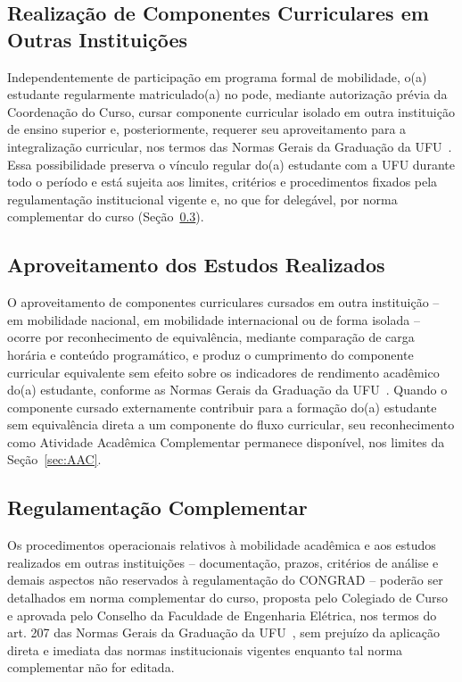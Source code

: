 \subsection{Realização de Componentes Curriculares em Outras Instituições}

Independentemente de participação em programa formal de mobilidade, o(a) estudante regularmente matriculado(a) no \ppccurso pode, mediante autorização prévia da Coordenação do Curso, cursar componente curricular isolado em outra instituição de ensino superior e, posteriormente, requerer seu aproveitamento para a integralização curricular, nos termos das Normas Gerais da Graduação da UFU~\cite{ufu_congrad_46_2022}. Essa possibilidade preserva o vínculo regular do(a) estudante com a UFU durante todo o período e está sujeita aos limites, critérios e procedimentos fixados pela regulamentação institucional vigente e, no que for delegável, por norma complementar do curso (Seção~\ref{sec:norma_complementar_mobilidade}).

\subsection{Aproveitamento dos Estudos Realizados}
\label{sec:mobilidade_aproveitamento}

O aproveitamento de componentes curriculares cursados em outra instituição -- em mobilidade nacional, em mobilidade internacional ou de forma isolada -- ocorre por reconhecimento de equivalência, mediante comparação de carga horária e conteúdo programático, e produz o cumprimento do componente curricular equivalente sem efeito sobre os indicadores de rendimento acadêmico do(a) estudante, conforme as Normas Gerais da Graduação da UFU~\cite{ufu_congrad_46_2022}. Quando o componente cursado externamente contribuir para a formação do(a) estudante sem equivalência direta a um componente do fluxo curricular, seu reconhecimento como Atividade Acadêmica Complementar permanece disponível, nos limites da Seção~\ref{sec:AAC}.

\subsection{Regulamentação Complementar}
\label{sec:norma_complementar_mobilidade}

Os procedimentos operacionais relativos à mobilidade acadêmica e aos estudos realizados em outras instituições -- documentação, prazos, critérios de análise e demais aspectos não reservados à regulamentação do CONGRAD -- poderão ser detalhados em norma complementar do curso, proposta pelo Colegiado de Curso e aprovada pelo Conselho da Faculdade de Engenharia Elétrica, nos termos do art. 207 das Normas Gerais da Graduação da UFU~\cite{ufu_congrad_46_2022}, sem prejuízo da aplicação direta e imediata das normas institucionais vigentes enquanto tal norma complementar não for editada.

